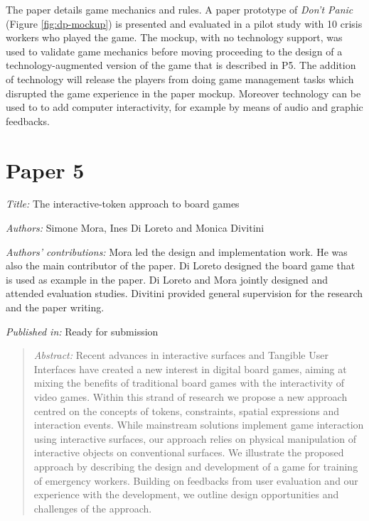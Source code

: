The paper details game mechanics and rules. A paper prototype of \emph{Don't Panic} (Figure \ref{fig:dp-mockup}) is presented and evaluated in a pilot study with 10 crisis workers who played the game. The mockup, with no technology support, was used to validate game mechanics before moving proceeding to the design of a technology-augmented version of the game that is described in P5. The addition of technology will release the players from doing game management tasks which disrupted the game experience in the paper mockup. Moreover technology can be used to to add computer interactivity, for example by means of audio and graphic feedbacks. 



\section[P5: The interactive-token approach to board games]{Paper 5}\label{paper-5}

\emph{Title:} The interactive-token approach to board games

\emph{Authors:} Simone Mora, Ines Di Loreto and Monica Divitini

\emph{Authors' contributions:} Mora led the design and implementation work. He was also the main contributor of the paper. Di Loreto designed the board game that is used as example in the paper. Di Loreto and Mora jointly designed and attended evaluation studies. Divitini provided general supervision for the research and the paper writing.

\emph{Published in:} Ready for submission 

\begin{quote}
	\emph{Abstract:} Recent advances in interactive surfaces and Tangible User Interfaces have created a new interest in digital board games, aiming at mixing the benefits of traditional board games with the interactivity of video games. Within this strand of research we propose a new approach centred on the concepts of tokens, constraints, spatial expressions and interaction events. While mainstream solutions implement game interaction using interactive surfaces, our approach relies on physical manipulation of interactive objects on conventional surfaces. We illustrate the proposed approach by describing the design and development of a game for training of emergency workers. Building on feedbacks from user evaluation and our experience with the development, we outline design opportunities and challenges of the approach. 
\end{quote}

